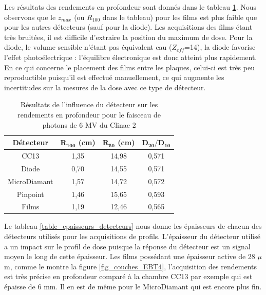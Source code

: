 \documentclass{book}
\begin{document}
Les résultats des rendements en profondeur sont donnés dans le tableau \ref*{table_rdt_detecteurs_ponctuels}. Nous observons que le $z_{max}$ (ou $R_{100}$ dans le tableau) pour les films est plus faible que pour les autres détecteurs (sauf pour la diode). Les acquisitions des films étant très bruitées, il est difficile d'extraire la position du maximum de dose. Pour la diode, le volume sensible n'étant pas équivalent eau ($Z_{eff}$=14), la diode favorise l'effet photoélectrique : l'équilibre électronique est donc atteint plus rapidement. En ce qui concerne le placement des films entre les plaques, celui-ci est très peu reproductible puisqu'il est effectué manuellement, ce qui augmente les incertitudes sur la mesures de la dose avec ce type de détecteur.

\begin{table}[h]
  \centering
  \begin{tabular}{cccc}
    \toprule
    \textbf{Détecteur} & $\mathbf{R_{100}}$ \textbf{(cm)} & $\mathbf{R_{50}}$ \textbf{(cm)} & $\mathbf{D_{20}/D_{10}}$ \\
    \toprule
    CC13 & 1,35 & 14,98 & 0,571 \\
    Diode & 0,70 & 14,55 & 0,571 \\
    MicroDiamant & 1,57 & 14,72 & 0,572 \\
    Pinpoint & 1,46 & 15,65 & 0,593 \\
    Films & 1,19 & 12,46 & 0,565 \\
    \bottomrule
  \end{tabular}
  \caption{Résultats de l'influence du détecteur sur les rendements en profondeur pour le faisceau de photons de 6 MV du Clinac 2}
  \label{table_rdt_detecteurs_ponctuels}
\end{table}


Le tableau \ref*{table_epaisseurs_detecteurs} nous donne les épaisseurs de chacun des détecteurs utilisés pour les acquisitions de profils. L'épaisseur du détecteur utilisé a un impact sur le profil de dose puisque la réponse du détecteur est un signal moyen le long de cette épaisseur. Les films possédant une épaisseur active de 28 $\mu$m, comme le montre la figure \ref*{fig_couches_EBT4}, l'acquisition des rendements est très précise en profondeur comparé à la chambre CC13 par exemple qui est épaisse de 6 mm. Il en est de même pour le MicroDiamant qui est encore plus fin.
\end{document}
